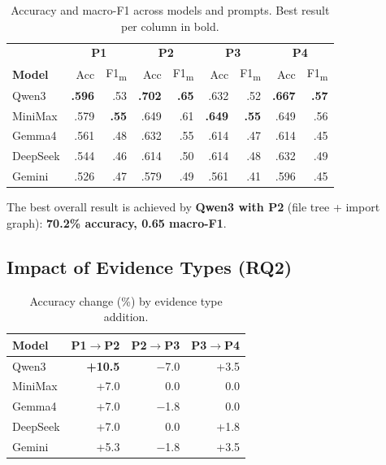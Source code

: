 \documentclass[runningheads]{llncs}
\begin{document}
\begin{table}[htbp]
\caption{Accuracy and macro-F1 across models and prompts. Best result per column in bold.}
\label{tab:accuracy}
\centering
\small
\begin{tabular}{l|rr|rr|rr|rr}
\toprule
& \multicolumn{2}{c|}{\textbf{P1}} & \multicolumn{2}{c|}{\textbf{P2}} & \multicolumn{2}{c|}{\textbf{P3}} & \multicolumn{2}{c}{\textbf{P4}} \\
\textbf{Model} & Acc & F1\textsubscript{m} & Acc & F1\textsubscript{m} & Acc & F1\textsubscript{m} & Acc & F1\textsubscript{m} \\
\midrule
Qwen3    & \textbf{.596} & .53 & \textbf{.702} & \textbf{.65} & .632 & .52 & \textbf{.667} & \textbf{.57} \\
MiniMax  & .579 & \textbf{.55} & .649 & .61 & \textbf{.649} & \textbf{.55} & .649 & .56 \\
Gemma4   & .561 & .48 & .632 & .55 & .614 & .47 & .614 & .45 \\
DeepSeek & .544 & .46 & .614 & .50 & .614 & .48 & .632 & .49 \\
Gemini   & .526 & .47 & .579 & .49 & .561 & .41 & .596 & .45 \\
\bottomrule
\end{tabular}
\end{table}

The best overall result is achieved by \textbf{Qwen3 with P2} (file tree + import graph): \textbf{70.2\% accuracy, 0.65 macro-F1}.

\subsection{Impact of Evidence Types (RQ2)}

\begin{table}[htbp]
\caption{Accuracy change (\%) by evidence type addition.}
\label{tab:evidence_delta}
\centering
\small
\begin{tabular}{lrrr}
\toprule
\textbf{Model} & \textbf{P1$\rightarrow$P2} & \textbf{P2$\rightarrow$P3} & \textbf{P3$\rightarrow$P4} \\
\midrule
Qwen3   & \textbf{+10.5} & $-$7.0 & +3.5 \\
MiniMax & +7.0 & 0.0 & 0.0 \\
Gemma4  & +7.0 & $-$1.8 & 0.0 \\
DeepSeek& +7.0 & 0.0 & +1.8 \\
Gemini  & +5.3 & $-$1.8 & +3.5 \\
\bottomrule
\end{tabular}
\end{table}
\end{document}
